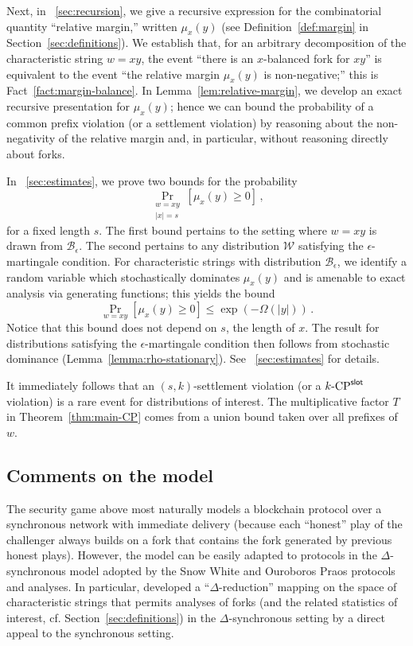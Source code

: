 Next, in \Section~\ref{sec:recursion}, 
we give a recursive expression for the combinatorial quantity 
``relative margin,'' written
$\mu_x(y)$ (see Definition~\ref{def:margin} in Section~\ref{sec:definitions}). 
We establish that,
for an arbitrary decomposition of the characteristic string $w = xy$, 
the event ``there is an $x$-balanced fork for $xy$'' 
is equivalent to the event 
``the relative margin $\mu_x(y)$ is non-negative;'' 
this is Fact~\ref{fact:margin-balance}. 
In Lemma~\ref{lem:relative-margin}, we develop an exact recursive presentation for $\mu_x(y)$; hence we can bound the probability of a common prefix violation
(or a settlement violation) 
by reasoning about the non-negativity of the relative margin 
and, in particular, without reasoning directly about forks. 

In \Section~\ref{sec:estimates}, we prove two bounds for the probability 
\[
  \Pr_{\substack{w = xy\\|x| = s}}[\mu_x(y) \geq 0]\,,
\]
for a fixed length $s$.  The first bound pertains to the setting where
$w = xy$ is drawn from $\mathcal{B}_\epsilon$. The second pertains to
any distribution $\mathcal{W}$ satisfying the $\epsilon$-martingale
condition.  For characteristic strings with distribution
$\mathcal{B}_\epsilon$, we identify a random variable which
stochastically dominates $\mu_x(y)$ and is amenable to exact analysis
via generating functions; this yields the bound
\[
  \Pr_{w=xy}[\mu_x(y) \geq 0] \leq \exp(-\Omega(|y|))
  \,.
\]
Notice that this bound does not depend on $s$, the length of $x$.  The
result for distributions satisfying the $\epsilon$-martingale
condition then follows from stochastic dominance
(Lemma~\ref{lemma:rho-stationary}).  See \Section~\ref{sec:estimates}
for details.

It immediately follows that 
an $(s,k)$-settlement violation (or a ${k}\text{-}\mathrm{CP}^{\mathsf{slot}}$ violation) is a rare event 
for distributions of interest. 
The multiplicative factor $T$ in Theorem~\ref{thm:main-CP} comes from a union bound 
taken over all prefixes of $w$.




\subsection{Comments on the model}
\label{sec:model-comments}

 The security
game above most naturally models a blockchain protocol over a
synchronous network with immediate delivery (because each ``honest''
play of the challenger always builds on a fork that contains the fork
generated by previous honest plays). However, the model can be easily
adapted to protocols in the $\Delta$-synchronous model adopted by
the Snow White and Ouroboros Praos protocols and analyses. In
particular, \citet{DBLP:conf/eurocrypt/DavidGKR18} developed a
``$\Delta$-reduction'' mapping on the space of characteristic strings
that permits analyses of forks (and the related statistics of
interest, cf. Section~\ref{sec:definitions}) in the $\Delta$-synchronous
setting by a direct appeal to the synchronous setting.

